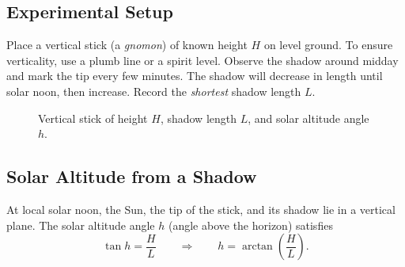 \documentclass[11pt]{article}
\begin{document}
\subsection*{Experimental Setup}

Place a vertical stick (a \emph{gnomon}) of known height $H$ on level ground.
To ensure verticality, use a plumb line or a spirit level. Observe the shadow
around midday and mark the tip every few minutes. The shadow will
decrease in length until solar noon, then increase. Record the \emph{shortest}
shadow length $L$.


\begin{figure}[h]
  \centering
  \caption{Vertical stick of height $H$, shadow length $L$, and solar altitude angle $h$.}
\end{figure}

\subsection*{Solar Altitude from a Shadow}

At local solar noon, the Sun, the tip of the stick, and its shadow lie in a
vertical plane. The solar altitude angle $h$ (angle above the horizon) satisfies
\[
\tan h = \frac{H}{L}
\qquad\Rightarrow\qquad
h = \arctan\!\left(\frac{H}{L}\right).
\]
\end{document}
